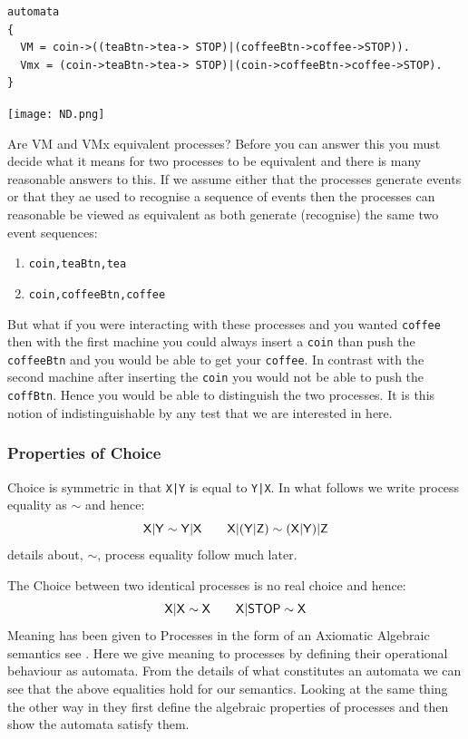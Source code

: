\documentclass[]{article}
\begin{document}
\noindent\begin{center}
\begin{minipage}{0.8\textwidth}
\begin{center}\begin{verbatim}
automata
{
  VM = coin->((teaBtn->tea-> STOP)|(coffeeBtn->coffee->STOP)).
  Vmx = (coin->teaBtn->tea-> STOP)|(coin->coffeeBtn->coffee->STOP).
}
\end{verbatim}
\texttt{[image: ND.png]}
\end{center}\end{minipage}

\end{center}

Are  {\sf VM}  and {\sf VMx}  equivalent processes?  Before you can answer this you must decide what  it means for two processes to be equivalent and there is many reasonable answers to this. If we assume either that the processes generate events or that they ae used to recognise a sequence of events then the processes can reasonable be viewed as equivalent as both generate (recognise) the same two event sequences:
\begin{enumerate}
\item \verb|coin,teaBtn,tea|
\item \verb|coin,coffeeBtn,coffee|
\end{enumerate}

But what if you were interacting with these processes and you wanted \verb|coffee| then  with the first machine you could always insert a \verb|coin| than push the \verb|coffeeBtn| and you would be able to get your \verb|coffee|. In contrast with the second machine after inserting the \verb|coin| you would not be able to push the \verb|coffBtn|. Hence you would be able to distinguish the two processes. It is this notion of indistinguishable by any test that we are interested in here.


\subsubsection{Properties of Choice}
 Choice is symmetric in that \verb$X|Y$ is equal to \verb$Y|X$. In what follows we write process equality as $\sim$ and hence:
 \[\sf X|Y\sim Y|X\qquad X|(Y|Z)\sim (X|Y)|Z\]
 details about, $\sim$,  process equality follow much later. 

The Choice between two identical processes is no real choice and hence:
\[\sf X|X\sim X\qquad X|STOP \sim X\]
Meaning has been  given to Processes in the form of an Axiomatic Algebraic semantics see \cite{BaW90}. Here we give meaning to processes by defining their operational behaviour as automata. From the details of what constitutes an automata we can see that the above equalities hold for our semantics. Looking at the same thing the other way in \cite{BaW90} they first define the algebraic properties of processes and then show the automata satisfy them.
\end{document}
